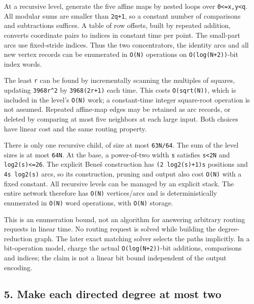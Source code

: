 At a recursive level, generate the five affine maps by nested loops over \texttt{0\textless{}=x,y\textless{}q}. All modular sums are smaller than \texttt{2q+1}, so a constant number of comparisons and subtractions suffices. A table of row offsets, built by repeated addition, converts coordinate pairs to indices in constant time per point. The small-part arcs use fixed-stride indices. Thus the two concentrators, the identity arcs and all new vertex records can be enumerated in \texttt{O(N)} operations on \texttt{O(log(N+2))}-bit index words.

The least \texttt{r} can be found by incrementally scanning the multiples of squares, updating \texttt{3968r\^{}2} by \texttt{3968(2r+1)} each time. This costs \texttt{O(sqrt(N))}, which is included in the level's \texttt{O(N)} work; a constant-time integer square-root operation is not assumed. Repeated affine-map edges may be retained as arc records, or deleted by comparing at most five neighbors at each large input. Both choices have linear cost and the same routing property.

There is only one recursive child, of size at most \texttt{63N/64}. The sum of the level sizes is at most \texttt{64N}. At the base, a power-of-two width \texttt{s} satisfies \texttt{s\textless{}2N} and \texttt{log2(s)\textless{}=26}. The explicit Beneš construction has \texttt{(2\ log2(s)+1)s} positions and \texttt{4s\ log2(s)} arcs, so its construction, pruning and output also cost \texttt{O(N)} with a fixed constant. All recursive levels can be managed by an explicit stack. The entire network therefore has \texttt{O(N)} vertices/arcs and is deterministically enumerated in \texttt{O(N)} word operations, with \texttt{O(N)} storage.

This is an enumeration bound, not an algorithm for answering arbitrary routing requests in linear time. No routing request is solved while building the degree-reduction graph. The later exact matching solver selects the paths implicitly. In a bit-operation model, charge the actual \texttt{O(log(N+2))}-bit additions, comparisons and indices; the claim is not a linear bit bound independent of the output encoding.

\hypertarget{af-a1dc8f9b11-make-each-directed-degree-at-most-two}{%
\subsection{5. Make each directed degree at most two}\label{af-a1dc8f9b11-make-each-directed-degree-at-most-two}}

